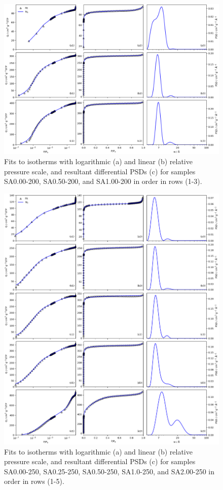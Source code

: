 \begin{subappendices}
\begin{figure}[p]
    \centering
    \includegraphics[width=\columnwidth, keepaspectratio]{4-impregnation/figs/SAxxx-200_isopsd.png}
    \caption{Fits to  isotherms with logarithmic (a) and linear (b) relative pressure scale, and resultant differential PSDs (c) for samples SA0.00-200, SA0.50-200, and SA1.00-200 in order in rows (1-3).}
    \label{fig:SAxxx-200_isopsd}
\end{figure}

\begin{figure}[p]
    \centering
    \includegraphics[width=\columnwidth, keepaspectratio]{4-impregnation/figs/SAxxx-250_isopsd.png}
    \caption{Fits to  isotherms with logarithmic (a) and linear (b) relative pressure scale, and resultant differential PSDs (c) for samples SA0.00-250, SA0.25-250, SA0.50-250, SA1.0-250, and SA2.00-250 in order in rows (1-5).}
    \label{fig:SAxxx-250_isopsd}
\end{figure}


\end{subappendices}
